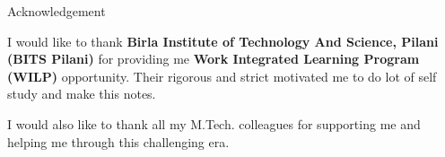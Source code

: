 \thispagestyle{empty}


\begin{center}
    \Huge Acknowledgement
    \vspace{0.5cm}
\end{center}


\begin{justify}
    I would like to thank \textbf{Birla Institute of Technology And Science, Pilani (BITS Pilani)} for providing me \textbf{Work Integrated Learning Program (WILP)} opportunity. Their rigorous and strict motivated me to do lot of self study and make this notes.
    
    
    
    I would also like to thank all my M.Tech. colleagues for supporting me and helping me through this challenging era.

    
    
\end{justify}


\restoregeometry

